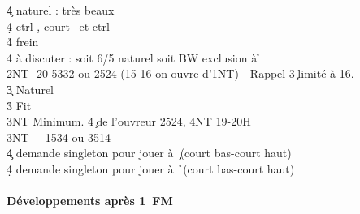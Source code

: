 \documentclass[a4paper]{article}
\begin{document}
\begin{bidtable}
4\c \> naturel : très beaux \c \\
4\d \> ctrl \d , court \s\ et ctrl \c \\
4\h \> frein\\
4\s \> à discuter : soit 6/5 naturel soit BW exclusion à \h \-\\
2NT -20 5332 ou 2524 (15-16 on ouvre d'1NT) - Rappel 3\c\ limité à 16.\+\\
3\c \> Naturel\\
3\h \> Fit \h \\
3NT \> Minimum. 4\c\ de l'ouvreur 2524, 4NT 19-20H\-\\
3NT + 1534 ou 3514\+\\
4\c \> demande singleton pour jouer à \c\ (court bas-court haut)\\
4\d \> demande singleton pour jouer à \h\ (court bas-court haut)\-\-
\end{bidtable}

\paragraph{Développements après 1\pdfc\ FM}
\end{document}
